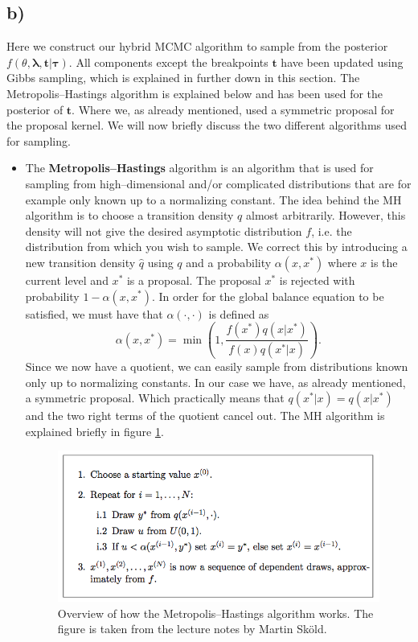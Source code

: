 \subsection*{b)}

Here we construct our hybrid MCMC algorithm to sample from the posterior $f(\theta,\boldsymbol{\lambda},\boldsymbol{t}|\boldsymbol{\tau})$. All components except the breakpoints $\boldsymbol{t}$ have been updated using Gibbs sampling, which is explained in further down in this section. The Metropolis--Hastings algorithm is explained below and has been used for the posterior of $\boldsymbol{t}$. Where we, as already mentioned, used a symmetric proposal for the proposal kernel. We will now briefly discuss the two different algorithms used for sampling.
\begin{itemize}
\item{The \textbf{Metropolis--Hastings} algorithm is an algorithm that is used for sampling from high--dimensional and/or complicated distributions that are for example only known up to a normalizing constant. The idea behind the MH algorithm is to choose a transition density $q$ almost arbitrarily. However, this density will not give the desired asymptotic distribution $f$, i.e. the distribution from which you wish to sample. We correct this by introducing a new transition density $\hat{q}$ using $q$ and a probability $\alpha(x,x^*)$ where $x$ is the current level and $x^*$ is a proposal. The proposal $x^*$ is rejected with probability $1 - \alpha(x,x^*)$. In order for the global balance equation to be satisfied, we must have that $\alpha(\cdot,\cdot)$ is defined as 
\[\alpha(x,x^*) = \min \left ( 1, \frac{f(x^*)q(x|x^*)}{f(x)q(x^*|x )} \right ) .\]
Since we now have a quotient, we can easily sample from distributions known only up to normalizing constants.
In our case we have, as already mentioned, a symmetric proposal. Which practically means that $q(x^*|x ) = q(x|x^* )$ and the two right terms of the quotient cancel out. The MH algorithm is explained briefly in figure \ref{fig:metrohast}.
\begin{figure}[H]
  \centering
    \includegraphics[scale=0.34]{./Figures/metrohast.png}
  \caption[An Electron]{Overview of how the Metropolis--Hastings algorithm works. The figure is taken from the lecture notes by Martin Sk\"old.}
  \label{fig:metrohast}
\end{figure}
}


\end{itemize}
